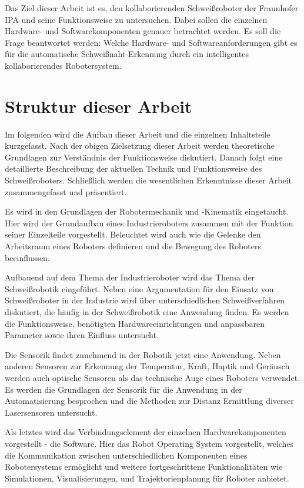 Das Ziel dieser Arbeit ist es, den kollaborierenden Schweißroboter der Fraunhofer IPA und seine Funktionsweise zu untersuchen. Dabei sollen die einzelnen Hardware- und Softwarekomponenten genauer betrachtet werden. Es soll die Frage beantwortet werden: Welche Hardware- und Softwareanforderungen gibt es für die automatische Schweißnaht-Erkennung durch ein intelligentes kollaborierendes Robotersystem.

\section{Struktur dieser Arbeit}
Im folgenden wird die Aufbau dieser Arbeit und die einzelnen Inhaltsteile kurzgefasst. Nach der obigen Zielsetzung dieser Arbeit werden theoretische Grundlagen zur Verständnis der Funktionsweise diskutiert. Danach folgt eine detaillierte Beschreibung der aktuellen Technik und Funktionsweise des Schweißroboters. Schließlich werden die wesentlichen Erkenntnisse dieser Arbeit zusammengefasst und präsentiert.

Es wird in den Grundlagen der Robotermechanik und -Kinematik eingetaucht. Hier wird der Grundaufbau eines Industrieroboters zusammen mit der Funktion seiner Einzelteile vorgestellt. Beleuchtet wird auch wie die Gelenke den Arbeitsraum eines Roboters definieren und die Bewegung des Roboters beeinflussen. 

Aufbauend auf dem Thema der Industrieroboter wird das Thema der Schweißrobotik eingeführt. Neben eine Argumentation für den Einsatz von Schweißroboter in der Industrie wird über unterschiedlichen Schweißverfahren diskutiert, die häufig in der Schweißrobotik eine Anwendung finden. Es werden die Funktionsweise, benötigten Hardwareeinrichtungen und anpassbaren Parameter sowie ihren Einfluss untersucht. 

Die Sensorik findet zunehmend in der Robotik jetzt eine Anwendung. Neben anderen Sensoren zur Erkennung der Temperatur, Kraft, Haptik und Geräusch werden auch optische Sensoren als das technische Auge eines Roboters verwendet. Es werden die Grundlagen der Sensorik für die Anwendung in der Automatisierung besprochen und die Methoden zur Distanz Ermittlung diverser Lasersensoren untersucht. 

Als letztes wird das Verbindungselement der einzelnen Hardwarekomponenten vorgestellt - die Software. Hier das Robot Operating System vorgestellt, welches die Kommunikation zwischen unterschiedlichen Komponenten eines Robotersystems ermöglicht und weitere fortgeschrittene Funktionalitäten wie Simulationen, Visualisierungen, und Trajektorienplanung für Roboter anbietet.

